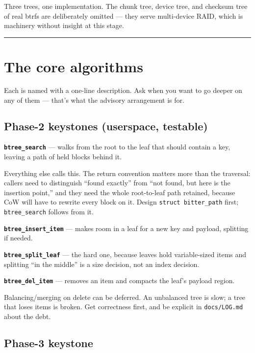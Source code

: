 Three trees, one implementation. The chunk tree, device tree, and checksum tree of real
btrfs are deliberately omitted --- they serve multi-device RAID, which is machinery without
insight at this stage.

\begin{center}\rule{0.5\linewidth}{0.5pt}\end{center}

\hypertarget{the-core-algorithms}{%
\section{The core algorithms}\label{the-core-algorithms}}

Each is named with a one-line description. Ask when you want to go deeper on any of them ---
that's what the advisory arrangement is for.

\hypertarget{phase-2-keystones-userspace-testable}{%
\subsection{Phase-2 keystones (userspace, testable)}\label{phase-2-keystones-userspace-testable}}

\textbf{\texttt{btree\_search}} --- walks from the root to the leaf that should contain a key, leaving a
path of held blocks behind it.

Everything else calls this. The return convention matters more than the traversal: callers
need to distinguish ``found exactly'' from ``not found, but here is the insertion point,'' and
they need the whole root-to-leaf path retained, because CoW will have to rewrite every
block on it. Design \texttt{struct\ bitter\_path} first; \texttt{btree\_search} follows from it.

\textbf{\texttt{btree\_insert\_item}} --- makes room in a leaf for a new key and payload, splitting if
needed.

\textbf{\texttt{btree\_split\_leaf}} --- the hard one, because leaves hold variable-sized items and
splitting ``in the middle'' is a size decision, not an index decision.

\textbf{\texttt{btree\_del\_item}} --- removes an item and compacts the leaf's payload region.

Balancing/merging on delete can be deferred. An unbalanced tree is slow; a tree that
loses items is broken. Get correctness first, and be explicit in \texttt{docs/LOG.md} about the
debt.

\hypertarget{phase-3-keystone}{%
\subsection{Phase-3 keystone}\label{phase-3-keystone}}

